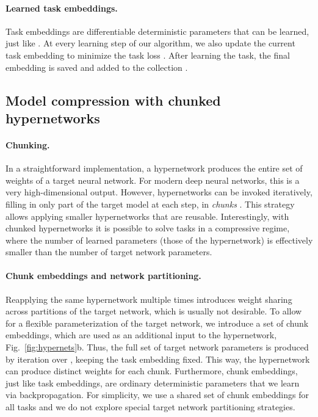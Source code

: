 \documentclass{article}
\begin{document}
\paragraph{Learned task embeddings.} Task embeddings are differentiable deterministic parameters that can be learned, just like . At every learning step of our algorithm, we also update the current task embedding  to minimize the task loss . After learning the task, the final embedding is saved and added to the collection .





\subsection{Model compression with chunked hypernetworks}
\label{sec:compression}

\paragraph{Chunking.} In a straightforward implementation, a hypernetwork produces the entire set of weights of a target neural network. For modern deep neural networks, this is a very high-dimensional output.
However, hypernetworks can be invoked iteratively, filling in only part of the target model at each step, in \emph{chunks} \citep{ha_hypernetworks_2017,pawlowski_implicit_2017}. This strategy allows applying smaller hypernetworks that are reusable. Interestingly, with chunked hypernetworks it is possible to solve tasks in a compressive regime, where the number of learned parameters (those of the hypernetwork) is effectively smaller than the number of target network parameters. 



\paragraph{Chunk embeddings and network partitioning.} Reapplying the same hypernetwork multiple times introduces weight sharing across partitions of the target network, which is usually not desirable. To allow for a flexible parameterization of the target network, we introduce a set  of chunk embeddings, which are used as an additional input to the hypernetwork, Fig.~\ref{fig:hypernets}b. Thus, the full set of target network parameters  is produced by iteration over , keeping the task embedding  fixed. This way, the hypernetwork can produce distinct weights for each chunk. Furthermore, chunk embeddings, just like task embeddings, are ordinary deterministic parameters that we learn via backpropagation. For simplicity, we use a shared set of chunk embeddings for all tasks and we do not explore special target network partitioning strategies.
\end{document}
